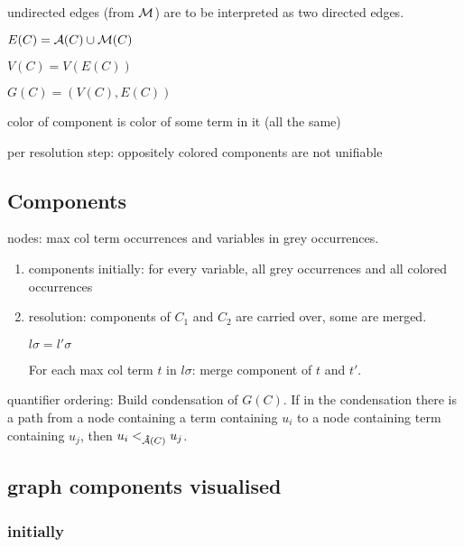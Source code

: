 \documentclass[,%
	paper=a4,%
	DIV10, %
	twoside=false,%
	liststotoc,
	bibtotoc,
	draft=false,%
	numbers=noendperiod
]{scrartcl}
\begin{document}
undirected edges (from $\operatorname{\mathcal{M}}$) are to be interpreted as two directed edges.

$E(C) = \operatorname{\mathcal{A}}(C)\cup\operatorname{\mathcal{M}}(C)$

$V(C) = V(E(C))$

$G(C) = (V(C), E(C))$


color of component is color of some term in it (all the same)

per resolution step: 
oppositely colored components are not unifiable

\subsection*{Components}

nodes: max col term occurrences and variables in grey occurrences.

\begin{enumerate}
	\item

		components initially:
		for every variable, all grey occurrences and all colored occurrences 

	\item
		resolution: 
		components of $C_1$ and $C_2$ are carried over, some are merged.

		$l\sigma = l'\sigma$

		For each max col term $t$ in $l\sigma$: merge component of $t$ and $t'$.

\end{enumerate}

quantifier ordering: Build condensation of $G(C)$. If in the condensation there is a path from a node containing a term containing $u_i$ to a node containing term containing $u_j$, then $u_i <_{\operatorname{{\mathcal{\bm{\hat}A}}}(C)} u_j$.

\subsection*{graph components visualised}

\subsubsection*{initially}
\end{document}
